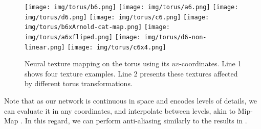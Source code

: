 \pagebreak
\begin{figure}[!h]
\centering
\texttt{[image: img/torus/b6.png]}
\texttt{[image: img/torus/a6.png]}
\texttt{[image: img/torus/d6.png]}
\texttt{[image: img/torus/c6.png]}
\texttt{[image: img/torus/b6xArnold-cat-map.png]}
\texttt{[image: img/torus/a6xfliped.png]}
\texttt{[image: img/torus/d6-non-linear.png]}
\texttt{[image: img/torus/c6x4.png]}
\vspace{-0.3cm}
\caption{Neural texture mapping on the torus using its $uv$-coordinates. Line 1 shows four texture examples. Line 2 presents these textures affected by different torus transformations.}
\label{f:surface_texture_mapping}
\end{figure}


\vspace{-0.4cm}

Note that as our network is continuous in space and encodes levels of details, we can evaluate it in any coordinates, and interpolate between levels, akin to Mip-Map \cite{mipmap83}. 
In this regard, we can perform anti-aliasing similarly to the results in \cite{paz2023mr}.







